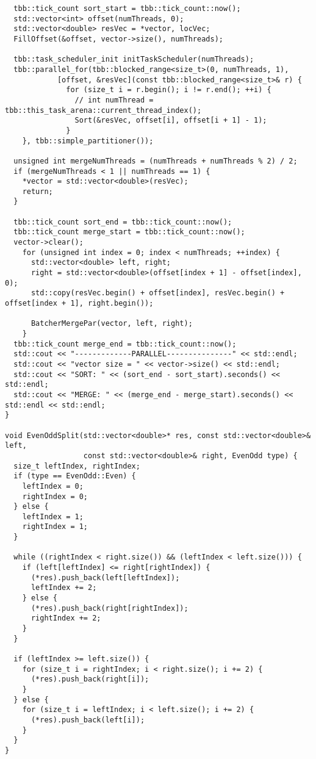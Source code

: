 \documentclass{report}
\begin{document}
\begin{lstlisting}
  tbb::tick_count sort_start = tbb::tick_count::now();
  std::vector<int> offset(numThreads, 0);
  std::vector<double> resVec = *vector, locVec;
  FillOffset(&offset, vector->size(), numThreads);

  tbb::task_scheduler_init initTaskScheduler(numThreads);
  tbb::parallel_for(tbb::blocked_range<size_t>(0, numThreads, 1),
            [offset, &resVec](const tbb::blocked_range<size_t>& r) {
              for (size_t i = r.begin(); i != r.end(); ++i) {
                // int numThread = tbb::this_task_arena::current_thread_index();
                Sort(&resVec, offset[i], offset[i + 1] - 1);
              }
    }, tbb::simple_partitioner());

  unsigned int mergeNumThreads = (numThreads + numThreads % 2) / 2;
  if (mergeNumThreads < 1 || numThreads == 1) {
    *vector = std::vector<double>(resVec);
    return;
  }

  tbb::tick_count sort_end = tbb::tick_count::now();
  tbb::tick_count merge_start = tbb::tick_count::now();
  vector->clear();
    for (unsigned int index = 0; index < numThreads; ++index) {
      std::vector<double> left, right;
      right = std::vector<double>(offset[index + 1] - offset[index], 0);
      std::copy(resVec.begin() + offset[index], resVec.begin() + offset[index + 1], right.begin());

      BatcherMergePar(vector, left, right);
    }
  tbb::tick_count merge_end = tbb::tick_count::now();
  std::cout << "-------------PARALLEL---------------" << std::endl;
  std::cout << "vector size = " << vector->size() << std::endl;
  std::cout << "SORT: " << (sort_end - sort_start).seconds() << std::endl;
  std::cout << "MERGE: " << (merge_end - merge_start).seconds() << std::endl << std::endl;
}

void EvenOddSplit(std::vector<double>* res, const std::vector<double>& left,
                  const std::vector<double>& right, EvenOdd type) {
  size_t leftIndex, rightIndex;
  if (type == EvenOdd::Even) {
    leftIndex = 0;
    rightIndex = 0;
  } else {
    leftIndex = 1;
    rightIndex = 1;
  }

  while ((rightIndex < right.size()) && (leftIndex < left.size())) {
    if (left[leftIndex] <= right[rightIndex]) {
      (*res).push_back(left[leftIndex]);
      leftIndex += 2;
    } else {
      (*res).push_back(right[rightIndex]);
      rightIndex += 2;
    }
  }

  if (leftIndex >= left.size()) {
    for (size_t i = rightIndex; i < right.size(); i += 2) {
      (*res).push_back(right[i]);
    }
  } else {
    for (size_t i = leftIndex; i < left.size(); i += 2) {
      (*res).push_back(left[i]);
    }
  }
}


\end{lstlisting}
\end{document}

